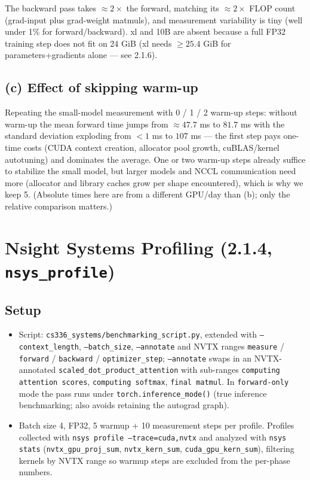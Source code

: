 \documentclass[11pt]{article}
\newcommand{\code}[1]{\texttt{#1}}
\begin{document}
The backward pass takes ${\approx}2\times$ the forward, matching its ${\approx}2\times$ FLOP count
(grad-input plus grad-weight matmuls), and measurement variability is tiny (well under 1\% for
forward/backward). xl and 10B are absent because a full FP32 training step does not fit on 24 GiB
(xl needs ${\geq}25.4$ GiB for parameters+gradients alone --- see 2.1.6).

\subsection{(c) Effect of skipping warm-up}

Repeating the small-model measurement with 0 / 1 / 2 warm-up steps: without warm-up the mean
forward time jumps from ${\approx}47.7$ ms to $81.7$ ms with the standard deviation exploding from
${<}1$ ms to $107$ ms --- the first step pays one-time costs (CUDA context creation, allocator pool
growth, cuBLAS/kernel autotuning) and dominates the average. One or two warm-up steps already
suffice to stabilize the small model, but larger models and NCCL communication need more (allocator
and library caches grow per shape encountered), which is why we keep 5. (Absolute times here are
from a different GPU/day than (b); only the relative comparison matters.)

\section{Nsight Systems Profiling (2.1.4, \texttt{nsys\_profile})}

\subsection{Setup}

\begin{itemize}
\item Script: \code{cs336\_systems/benchmarking\_script.py}, extended with \code{--context\_length},
      \code{--batch\_size}, \code{--annotate} and NVTX ranges \code{measure} / \code{forward} /
      \code{backward} / \code{optimizer\_step}; \code{--annotate} swaps in an NVTX-annotated
      \code{scaled\_dot\_product\_attention} with sub-ranges \code{computing attention scores},
      \code{computing softmax}, \code{final matmul}. In \code{forward-only} mode the pass runs under
      \code{torch.inference\_mode()} (true inference benchmarking; also avoids retaining the
      autograd graph).
\item Batch size 4, FP32, 5 warmup + 10 measurement steps per profile. Profiles collected with
      \code{nsys profile --trace=cuda,nvtx} and analyzed with \code{nsys stats}
      (\code{nvtx\_gpu\_proj\_sum}, \code{nvtx\_kern\_sum}, \code{cuda\_gpu\_kern\_sum}), filtering
      kernels by NVTX range so warmup steps are excluded from the per-phase numbers.
\end{itemize}
\end{document}
